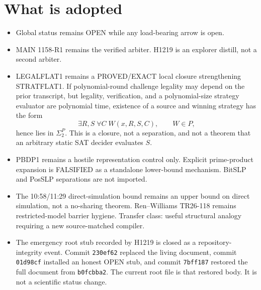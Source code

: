 \documentclass[11pt]{article}
\begin{document}
\section*{What is adopted}
\begin{itemize}
\item Global status remains OPEN while any load-bearing arrow is open.
\item MAIN 1158-R1 remains the verified arbiter. H1219 is an explorer distill, not a second arbiter.
\item LEGALFLAT1 remains a PROVED/EXACT local closure strengthening STRATFLAT1. If polynomial-round
challenge legality may depend on the prior transcript, but legality, verification, and a
polynomial-size strategy evaluator are polynomial time, existence of a source and winning strategy
has the form
\[
\exists R,S\;\forall C\;W(x,R,S,C),\qquad W\in P,
\]
hence lies in \(\Sigma_2^P\). This is a closure, not a separation, and not a theorem that an
arbitrary static SAT decider evaluates \(S\).
\item PBDP1 remains a hostile representation control only. Explicit prime-product expansion is
FALSIFIED as a standalone lower-bound mechanism. BitSLP and PosSLP separations are not imported.
\item The 10:58/11:29 direct-simulation bound remains an upper bound on direct simulation, not a
no-sharing theorem. Ren--Williams TR26-118 remains restricted-model barrier hygiene. Transfer class:
useful structural analogy requiring a new source-matched compiler.
\item The emergency root stub recorded by H1219 is closed as a repository-integrity event.
Commit \texttt{230ef62} replaced the living document, commit \texttt{01d98cf} installed an honest
OPEN stub, and commit \texttt{7bff187} restored the full document from
\texttt{b0fcbba2}. The current root file is that restored body. It is not a scientific status change.
\end{itemize}
\end{document}
